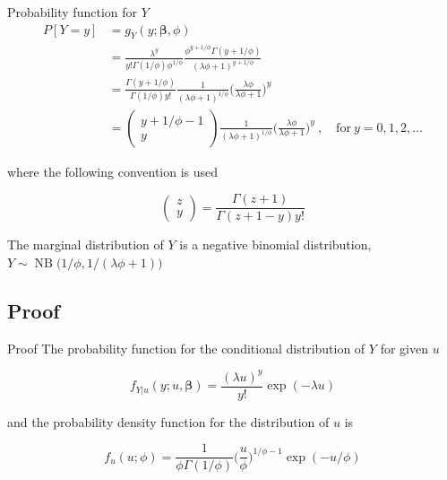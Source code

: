 \documentclass[aspectratio=169]{beamer}
\DeclareMathOperator{\NB}{NB}
\begin{document}
\begin{frame}{Probability function for \(Y\)}
\begin{equation} \label{eq:pdfMix}
  \begin{aligned}
    P[Y=y]&=g_{Y}(y;\boldsymbol \beta, \phi) \\
    &=\frac{\lambda^{y}}{y!\Gamma(1/\phi)\phi^{1/\phi}}\frac{\phi^{y+1/\phi}\Gamma(y+1/\phi)}{(\lambda \phi + 1)^{y+1/\phi}} \\
    &=\frac{\Gamma(y+1/\phi)}{\Gamma(1/\phi)y!}\frac{1}{(\lambda\phi+1)^{1/\phi}}\bigg(\frac{\lambda\phi}{\lambda\phi+1}\bigg)^{y} \\
    &=\begin{pmatrix} y+1/\phi-1 \\ y \end{pmatrix} \frac{1}{(\lambda\phi+1)^{1/\phi}}\bigg(\frac{\lambda\phi}{\lambda\phi+1}\bigg)^{y} \ , \quad \mathrm{for} \ y = 0, 1, 2, \dots
  \end{aligned}
\end{equation}

where the following convention is used

\begin{equation}
  \begin{pmatrix} z\\y \end{pmatrix} = \frac{\Gamma(z+1)}{\Gamma(z+1-y)y!}
\end{equation}

The marginal distribution of \(Y\) is a negative binomial distribution,
\(Y\sim \NB\big(1/\phi,1/(\lambda \phi+1)\big)\)
\end{frame}

\hypertarget{proof}{%
\subsection{Proof}\label{proof}}

\begin{frame}{Proof}
The probability function for the conditional distribution of \(Y\) for
given \(u\)

\begin{equation}\label{eq:pdfPois}
  f_{Y|u}(y;u,\boldsymbol{\beta})=\frac{(\lambda u)^{y}}{y!}\exp(-\lambda u)
\end{equation}

and the probability density function for the distribution of \(u\) is

\begin{equation} \label{eq:pdfGamma}
  f_{u}(u;\phi)=\frac{1}{\phi \Gamma(1/\phi)} \bigg(\frac{u}{\phi}\bigg)^{1/\phi-1} \exp (-u/\phi)
\end{equation}
\end{frame}
\end{document}

